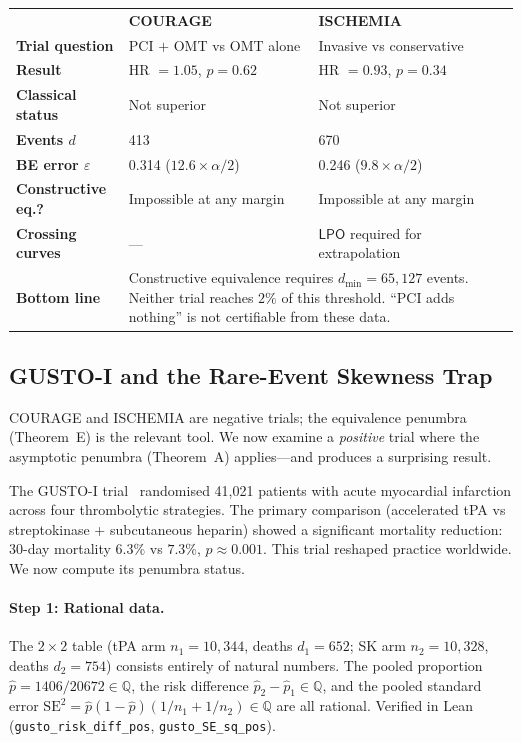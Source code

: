 \documentclass[11pt,a4paper]{article}
\theoremstyle{plain}
\theoremstyle{definition}
\newcommand{\LPO}{\textsf{LPO}}
\newcommand{\Q}{\mathbb{Q}}
\begin{document}
\begin{tcolorbox}[
  colback=green!3,
  colframe=green!40!black,
  fonttitle=\bfseries,
  title={Summary: COURAGE \& ISCHEMIA},
  arc=3pt, boxrule=0.6pt
]
\small
\begin{tabular}{@{}p{3cm}p{4.6cm}p{4.6cm}@{}}
& \textbf{COURAGE} & \textbf{ISCHEMIA} \\[2pt]
\textbf{Trial question} & PCI $+$ OMT vs OMT alone & Invasive vs conservative \\
\textbf{Result} & HR $= 1.05$, $p = 0.62$ & HR $= 0.93$, $p = 0.34$ \\
\textbf{Classical status} & Not superior & Not superior \\
\textbf{Events $d$} & 413 & 670 \\
\textbf{BE error $\varepsilon$} & 0.314 ($12.6\times\alpha/2$) & 0.246 ($9.8\times\alpha/2$) \\
\textbf{Constructive eq.?} & Impossible at any margin & Impossible at any margin \\
\textbf{Crossing curves} & --- & $\LPO$ required for extrapolation \\
\textbf{Bottom line} & \multicolumn{2}{p{9.2cm}}{Constructive equivalence requires $d_{\min} = 65{,}127$ events.  Neither trial reaches $2\%$ of this threshold.  ``PCI adds nothing'' is not certifiable from these data.}
\end{tabular}
\end{tcolorbox}

\subsection{GUSTO-I and the Rare-Event Skewness Trap}\label{sec:gusto}

COURAGE and ISCHEMIA are negative trials; the equivalence penumbra (Theorem~E) is the relevant tool.  We now examine a \emph{positive} trial where the asymptotic penumbra (Theorem~A) applies---and produces a surprising result.

The GUSTO-I trial~\cite{gusto} randomised 41{,}021 patients with acute myocardial infarction across four thrombolytic strategies.  The primary comparison (accelerated tPA vs streptokinase + subcutaneous heparin) showed a significant mortality reduction: 30-day mortality $6.3\%$ vs $7.3\%$, $p \approx 0.001$.  This trial reshaped practice worldwide.  We now compute its penumbra status.

\paragraph{Step 1: Rational data.}  The $2 \times 2$ table (tPA arm $n_1 = 10{,}344$, deaths $d_1 = 652$; SK arm $n_2 = 10{,}328$, deaths $d_2 = 754$) consists entirely of natural numbers.  The pooled proportion $\hat p = 1406/20672 \in \Q$, the risk difference $\hat p_2 - \hat p_1 \in \Q$, and the pooled standard error $\mathrm{SE}^2 = \hat p(1-\hat p)(1/n_1 + 1/n_2) \in \Q$ are all rational.  Verified in Lean (\texttt{gusto\_risk\_diff\_pos}, \texttt{gusto\_SE\_sq\_pos}).
\end{document}
